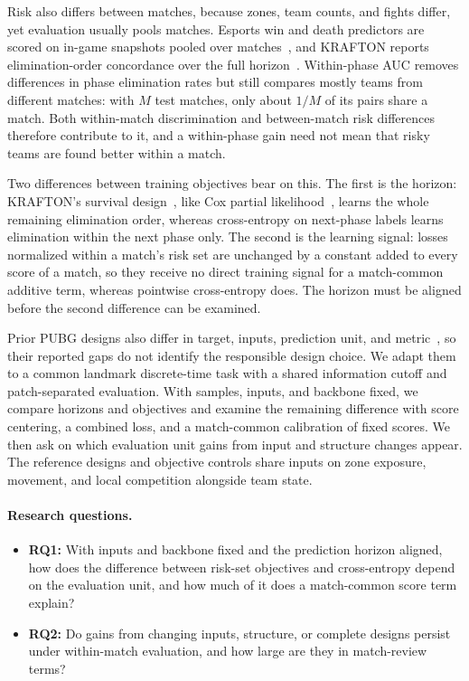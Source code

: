 \documentclass[sigconf,anonymous,nonacm]{acmart}
\begin{document}
Risk also differs between matches, because zones, team counts, and fights differ, yet evaluation usually pools matches. Esports win and death predictors are scored on in-game snapshots pooled over matches~\cite{Hodge21,Katona19,Marshall22}, and KRAFTON reports elimination-order concordance over the full horizon~\cite{KRAFTON}. Within-phase AUC removes differences in phase elimination rates but still compares mostly teams from different matches: with $M$ test matches, only about $1/M$ of its pairs share a match. Both within-match discrimination and between-match risk differences therefore contribute to it, and a within-phase gain need not mean that risky teams are found better within a match.

Two differences between training objectives bear on this. The first is the horizon: KRAFTON's survival design~\cite{KRAFTON}, like Cox partial likelihood~\cite{Cox72}, learns the whole remaining elimination order, whereas cross-entropy on next-phase labels learns elimination within the next phase only. The second is the learning signal: losses normalized within a match's risk set are unchanged by a constant added to every score of a match, so they receive no direct training signal for a match-common additive term, whereas pointwise cross-entropy does. The horizon must be aligned before the second difference can be examined.

Prior PUBG designs also differ in target, inputs, prediction unit, and metric~\cite{Sagong25a,KRAFTON}, so their reported gaps do not identify the responsible design choice. We adapt them to a common landmark discrete-time task with a shared information cutoff and patch-separated evaluation. With samples, inputs, and backbone fixed, we compare horizons and objectives and examine the remaining difference with score centering, a combined loss, and a match-common calibration of fixed scores. We then ask on which evaluation unit gains from input and structure changes appear. The reference designs and objective controls share inputs on zone exposure, movement, and local competition alongside team state.

\paragraph{Research questions.}
\begin{itemize}
\item \textbf{RQ1:} With inputs and backbone fixed and the prediction horizon aligned, how does the difference between risk-set objectives and cross-entropy depend on the evaluation unit, and how much of it does a match-common score term explain?
\item \textbf{RQ2:} Do gains from changing inputs, structure, or complete designs persist under within-match evaluation, and how large are they in match-review terms?
\end{itemize}
\end{document}
